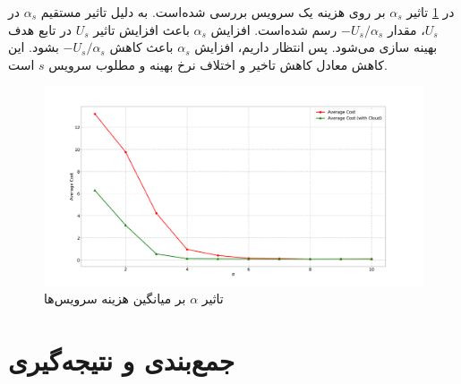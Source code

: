     در \cref{fig:many_to_many:sim8} تاثیر $\alpha_s$ بر روی هزینه یک سرویس بررسی شده‌است.
    به دلیل تاثیر مستقیم $\alpha_s$ در $U_s$، مقدار $-U_s/\alpha_s$ رسم شده‌است.
    افزایش $\alpha_s$ باعث افزایش تاثیر $U_s$ در تابع هدف بهینه سازی می‌شود.
    پس انتظار داریم، افزایش $\alpha_s$ باعث کاهش $-U_s/\alpha_s$ بشود.
    این کاهش معادل کاهش تاخیر و اختلاف نرخ بهینه و مطلوب سرویس $s$ است.

    \begin{figure}[H]
      \centerline{\includegraphics[width=17cm]{graphics/many_to_many/sim_8}}
      \caption{تاثیر $\alpha$ بر میانگین هزینه سرویس‌ها}
      \label{fig:many_to_many:sim8}
    \end{figure}

  \section{جمع‌بندی و نتیجه‌گیری}
    

